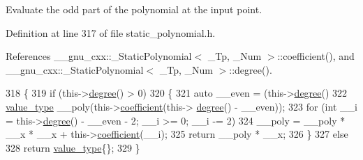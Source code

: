 Evaluate the odd part of the polynomial at the input point. 

Definition at line 317 of file static\+\_\+polynomial.\+h.



References \+\_\+\+\_\+gnu\+\_\+cxx\+::\+\_\+\+Static\+Polynomial$<$ \+\_\+\+Tp, \+\_\+\+Num $>$\+::coefficient(), and \+\_\+\+\_\+gnu\+\_\+cxx\+::\+\_\+\+Static\+Polynomial$<$ \+\_\+\+Tp, \+\_\+\+Num $>$\+::degree().


\begin{DoxyCode}
318       \{
319         \textcolor{keywordflow}{if} (this->\hyperlink{class____gnu__cxx_1_1__StaticPolynomial_a56b1719601ce049e6dd768e10edfd171}{degree}() > 0)
320           \{
321             \textcolor{keyword}{auto} \_\_even = (this->\hyperlink{class____gnu__cxx_1_1__StaticPolynomial_a56b1719601ce049e6dd768e10edfd171}{degree}() %
322             \hyperlink{class____gnu__cxx_1_1__StaticPolynomial_af23110f5a002cd6caa3542df7cf35284}{value\_type} \_\_poly(this->\hyperlink{class____gnu__cxx_1_1__StaticPolynomial_a412fc570171031ff0f45db048dfda225}{coefficient}(this->
      \hyperlink{class____gnu__cxx_1_1__StaticPolynomial_a56b1719601ce049e6dd768e10edfd171}{degree}() - \_\_even));
323             \textcolor{keywordflow}{for} (\textcolor{keywordtype}{int} \_\_i = this->\hyperlink{class____gnu__cxx_1_1__StaticPolynomial_a56b1719601ce049e6dd768e10edfd171}{degree}() - \_\_even - 2; \_\_i >= 0; \_\_i -= 2)
324               \_\_poly = \_\_poly * \_\_x * \_\_x + this->\hyperlink{class____gnu__cxx_1_1__StaticPolynomial_a412fc570171031ff0f45db048dfda225}{coefficient}(\_\_i);
325             \textcolor{keywordflow}{return} \_\_poly * \_\_x;
326           \}
327         \textcolor{keywordflow}{else}
328           \textcolor{keywordflow}{return} \hyperlink{class____gnu__cxx_1_1__StaticPolynomial_af23110f5a002cd6caa3542df7cf35284}{value\_type}\{\};
329       \}
\end{DoxyCode}
\mbox{\label{class____gnu__cxx_1_1__StaticPolynomial_a4412225874bf2af0943abe9340024278}} 
